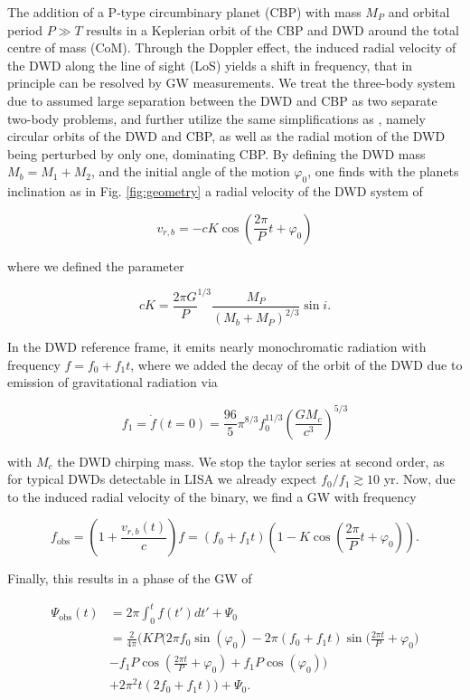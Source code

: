 \documentclass{aa}
\begin{document}
The addition of a P-type circumbinary planet (CBP) with mass $M_P$ and orbital period $P \gg T$ results in a Keplerian orbit of the CBP and DWD around the total centre of mass (CoM). Through the Doppler effect, the induced radial velocity of the DWD along the line of sight (LoS) yields a shift in frequency, that in principle can be resolved by GW measurements. We treat the three-body system due to assumed large separation between the DWD and CBP as two separate two-body problems, and further utilize the same simplifications as \citep{tamanini}, namely circular orbits of the DWD and CBP, as well as the radial motion of the DWD being perturbed by only one, dominating CBP. By defining the DWD mass $M_b = M_1 + M_2$, and the initial angle of the motion $\varphi_0$, one finds with the planets inclination as in Fig. \ref{fig:geometry} a radial velocity of the DWD system of

\begin{equation}
    v_{r,b} = -cK\cos{\left(\frac{2\pi}{P}t + \varphi_0\right)}
\end{equation}

where we defined the parameter

\begin{equation}
cK = \frac{2\pi G}{P}^{1/3} \frac{M_P}{(M_b + M_P)^{2/3}}\sin{i}.
\end{equation}

In the DWD reference frame, it emits nearly monochromatic radiation with frequency $f=f_{0} + f_1 t$, where we added the decay of the orbit of the DWD due to emission of gravitational radiation via

\begin{equation}
    f_1=\Dot{f}(t=0)= \frac{96}{5}\pi^{8/3}f_0^{11/3}\left(\frac{GM_c}{c^3}\right)^{5/3}
\end{equation}

with $M_c$ the DWD chirping mass. We stop the taylor series at second order, as for typical DWDs detectable in LISA we already expect $f_0/f_1 \gtrsim 10 $ yr. Now, due to the induced radial velocity of the binary, we find a GW with frequency

\begin{equation} \label{eq:freq}
f_{\text{obs}}= \left(1+\frac{v_{r,b}(t)}{c}\right)f=\left(f_{0} + f_1 t\right) \left(1-K\cos{\left(\frac{2\pi}{P}t + \varphi_0\right)} \right).
\end{equation}    

Finally, this results in a phase of the GW of

\begin{equation} \label{eq:phase}
\begin{split}
\Psi_{\text{obs}}(t) &= 2\pi\int_0^{t}f(t')dt' + \Psi_0 \\
 &= \frac{2}{4\pi} \Bigg( K P \bigg(2 \pi 
   f_0 \sin (\varphi_0) -2 \pi  (f_0+f_1 t) \sin \bigg( \frac{2 \pi  t}{P}+\varphi_0\bigg) \\
   &- f_1 P \cos \left(\frac{2 \pi  t}{P}+\varphi_0\right)+f_1 P \cos (\varphi_0)\bigg) \\
   &+ 2 \pi^2 t (2 f_0+f_1 t) \Bigg) + \Psi_0.
\end{split}
\end{equation}
\end{document}
